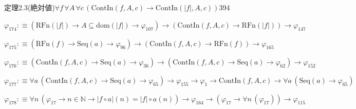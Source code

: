 \begin{fullproof}{定理2.3(絶対値)}{$\forall f\,\forall A\,\forall c\,(\mathrm{ContIn}(f,A,c) \to \mathrm{ContIn}(\lvert f \rvert,A,c))$}{394}
\begin{abbrevlist}
\item $\varphi_{174} :\equiv (\mathrm{RFn}(\lvert f \rvert) \to A \subseteq \mathrm{dom}(\lvert f \rvert) \to \varphi_{107}) \to (\mathrm{ContIn}(f,A,c) \to \mathrm{RFn}(\lvert f \rvert)) \to \varphi_{147}$
\item $\varphi_{175} :\equiv (\mathrm{RFn}(f) \to \mathrm{Seq}(a) \to \varphi_{96}) \to (\mathrm{ContIn}(f,A,c) \to \mathrm{RFn}(f)) \to \varphi_{165}$
\item $\varphi_{176} :\equiv (\mathrm{ContIn}(f,A,c) \to \mathrm{Seq}(a) \to \varphi_{36}) \to (\mathrm{ContIn}(f,A,c) \to \mathrm{Seq}(a) \to \varphi_{62}) \to \varphi_{152}$
\item $\varphi_{177} :\equiv \forall a\,(\mathrm{ContIn}(f,A,c) \to \mathrm{Seq}(a) \to \varphi_{65}) \to \varphi_{155} \to \varphi_{1} \to \mathrm{ContIn}(f,A,c) \to \forall a\,(\mathrm{Seq}(a) \to \varphi_{65})$
\item $\varphi_{178} :\equiv \forall n\,(\varphi_{17} \to n \in \mathbb{N} \to \lvert f \circ a \rvert(n) = \lvert f \rvert \circ a(n)) \to \varphi_{164} \to (\varphi_{17} \to \forall n\,(\varphi_{17})) \to \varphi_{115}$
\end{abbrevlist}
\end{fullproof}
